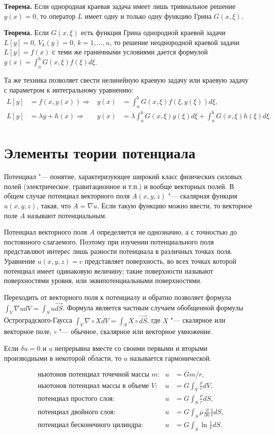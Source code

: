 \documentclass[a4paper,12pt]{article}
\begin{document}
\textbf{Теорема.} Если однородная краевая задача имеет лишь тривиальное решение
$y(x)=0$, то оператор $L$ имеет одну и только одну функцию Грина $G(x,\xi)$.

\textbf{Теорема.} Если $G(x,\xi)$ есть функция Грина однородной краевой задачи
$L[y]=0$, $V_k(y)=0$, $k=1,\dots,n$, то решение неоднородной краевой задачи
$L[y]=f(x)$ с теми же граничными условиями дается формулой
$y(x)=\int_{a}^{b}G(x,\xi)f(\xi)d\xi$.

Та же техника позволяет свести нелинейную краевую задачу
или краевую задачу с параметром к интегральному уравнению:
\begin{align*}
L[y]&=f(x,y(x)) \Rightarrow
    &y(x)&=\int_a^b G(x,\xi)f(\xi,y(\xi))d\xi,\\
L[y]&=\lambda y+h(x) \Rightarrow
    &y(x)&=\lambda\int_a^b G(x,\xi)y(\xi)d\xi+\int_a^b G(x,\xi)h(\xi)d\xi.
\end{align*}


\section{Элементы теории потенциала}

Потенциал "--- понятие, характеризующее широкий класс физических
силовых полей (электрическое, гравитационное и т.п.) и вообще
векторных полей. В общем случае потенциал векторного поля $A(x,y,z)$ "---
скалярная функция $u(x,y,z)$, такая, что $A=\nabla u$. Если такую функцию
можно ввести, то векторное поле $A$ называют потенциальным.

Потенциал векторного поля $A$ определяется не однозначно, а с точностью
до постоянного слагаемого. Поэтому при изучении потенциального поля
представляют интерес лишь разности потенциала в различных точках поля.
Уравнение $u(x,y,z)=c$ представляет поверхность, во всех точках которой
потенциал имеет одинаковую величину; такие поверхности называют
поверхностями уровня, или эквипотенциальными поверхностями.

Переходить от векторного поля к потенциалу и обратно позволяет формула
$\int_V \nabla udV=\int_S u\vec{dS}$. Формула является частным случаем
обобщенной формулы Остроградского-Гаусса
$\int_V \nabla\circ XdV=\int_S X\circ\vec{dS}$, где $X$ "--- скалярное
или векторное поле, $\circ$ "--- обычное, скалярное или векторное умножение.

Если $\delta u=0$ и $u$ непрерывна вместе со своими первыми и вторыми
производными в некоторой области, то $u$ называется гармонической.

\begin{align*}
&\text{ньютонов потенциал точечной массы $m$:}
    &u&=Gm/r,\\
&\text{ньютонов потенциал массы в объеме $V$:}
    &u&=G\int_V\frac{\rho}{r}dV,\\
&\text{потенциал простого слоя:}
    &u&=G\int_S\frac{\rho}{r}dS,\\
&\text{потенциал двойного слоя:}
    &u&=G\int_S\mu\frac{\partial}{\partial n}\frac{1}{r}dS,\\
&\text{потенциал бесконечного цилиндра:}
    &u&=G\int_S\ln\frac{1}{r}dS.
\end{align*}
\end{document}
